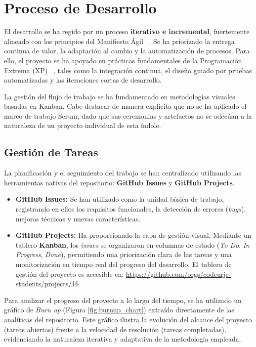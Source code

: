 \section{Proceso de Desarrollo} 
\label{sec:proceso_desarrollo}

El desarrollo se ha regido por un proceso \textbf{iterativo e incremental}, fuertemente alineado con los principios del Manifiesto Ágil ~\cite{ManifiestoAgil}. Se ha priorizado la entrega continua de valor, la adaptación al cambio y la automatización de procesos. Para ello, el proyecto se ha apoyado en prácticas fundamentales de la Programación Extrema (XP) ~\cite{Beck1999}, tales como la integración continua, el diseño guiado por pruebas automatizadas y las iteraciones cortas de desarrollo. 

La gestión del flujo de trabajo se ha fundamentado en metodologías visuales basadas en Kanban. Cabe destacar de manera explícita que no se ha aplicado el marco de trabajo Scrum, dado que sus ceremonias y artefactos no se adecúan a la naturaleza de un proyecto individual de esta índole.

\subsection{Gestión de Tareas} 
La planificación y el seguimiento del trabajo se han centralizado utilizando las herramientas nativas del repositorio: \textbf{GitHub Issues} y \textbf{GitHub Projects}. 

\begin{itemize}
    \item \textbf{GitHub Issues:} Se han utilizado como la unidad básica de trabajo, registrando en ellos los requisitos funcionales, la detección de errores (\textit{bugs}), mejoras técnicas y nuevas características.
    \item \textbf{GitHub Projects:} Ha proporcionado la capa de gestión visual. Mediante un tablero \textbf{Kanban}, los \textit{issues} se organizaron en columnas de estado (\textit{To Do}, \textit{In Progress}, \textit{Done}), permitiendo una priorización clara de las tareas y una monitorización en tiempo real del progreso del desarrollo. El tablero de gestión del proyecto es accesible en:
    \newline
    \url{https://github.com/orgs/codeurjc-students/projects/16}
\end{itemize}

Para analizar el progreso del proyecto a lo largo del tiempo, se ha utilizado un gráfico de \textit{Burn up} (Figura \ref{fig:burnup_chart}) extraído directamente de las analíticas del repositorio. Este gráfico ilustra la evolución del alcance del proyecto (tareas abiertas) frente a la velocidad de resolución (tareas completadas), evidenciando la naturaleza iterativa y adaptativa de la metodología empleada.

